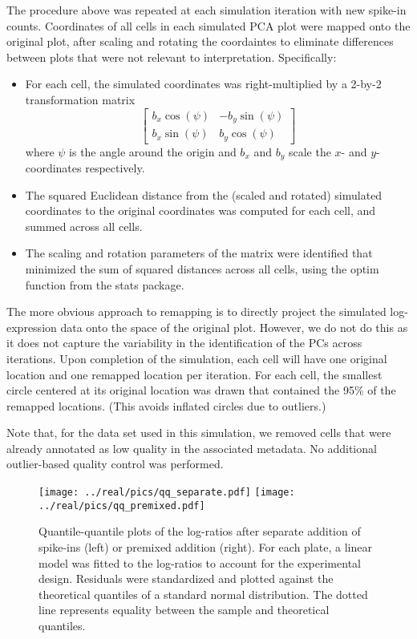 \documentclass{article}
\begin{document}
The procedure above was repeated at each simulation iteration with new spike-in counts.
Coordinates of all cells in each simulated PCA plot were mapped onto the original plot, after scaling and rotating the coordaintes to eliminate differences between plots that were not relevant to interpretation.
Specifically:
\begin{itemize}
    \item For each cell, the simulated coordinates was right-multiplied by a 2-by-2 transformation matrix
        \[
            \left[\begin{array}{cc}
                    b_x \cos(\psi) & - b_y \sin(\psi) \\
                    b_x \sin(\psi) & b_y \cos(\psi) 
                \end{array}
            \right]
        \]
        where $\psi$ is the angle around the origin and $b_x$ and $b_y$ scale the $x$- and $y$-coordinates respectively.
    \item The squared Euclidean distance from the (scaled and rotated) simulated coordinates to the original coordinates was computed for each cell, and summed across all cells.
    \item The scaling and rotation parameters of the matrix were identified that minimized the sum of squared distances across all cells, using the optim function from the stats package.
\end{itemize}
The more obvious approach to remapping is to directly project the simulated log-expression data onto the space of the original plot.
However, we do not do this as it does not capture the variability in the identification of the PCs across iterations.
Upon completion of the simulation, each cell will have one original location and one remapped location per iteration. 
For each cell, the smallest circle centered at its original location was drawn that contained the 95\% of the remapped locations.
(This avoids inflated circles due to outliers.)

Note that, for the data set used in this simulation, we removed cells that were already annotated as low quality in the associated metadata.
No additional outlier-based quality control was performed.

\begin{figure}[btp]
    \begin{center}
        \texttt{[image: ../real/pics/qq\_separate.pdf]}
        \texttt{[image: ../real/pics/qq\_premixed.pdf]}
    \end{center}
    \caption{Quantile-quantile plots of the log-ratios after separate addition of spike-ins (left) or premixed addition (right).
        For each plate, a linear model was fitted to the log-ratios to account for the experimental design.
        Residuals were standardized and plotted against the theoretical quantiles of a standard normal distribution.
        The dotted line represents equality between the sample and theoretical quantiles.
    }
\end{figure}
\end{document}
